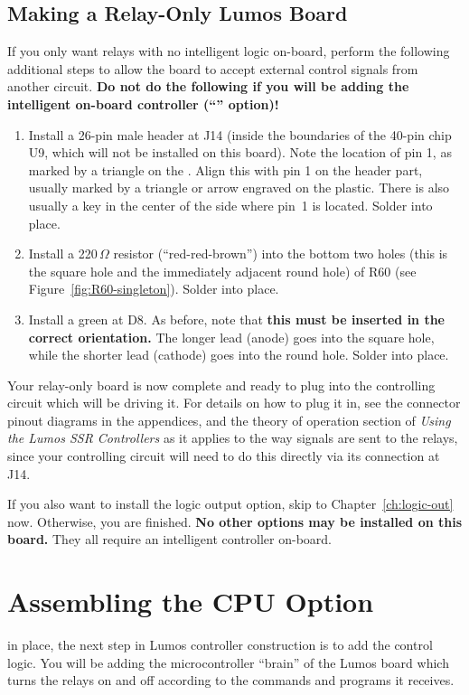 \documentclass[letterpaper,twoside,onecolumn,openright,final]{memoir}
\begin{document}
\section{Making a Relay-Only Lumos Board}
If you only want relays with no intelligent logic on-board, perform the following additional
steps to allow the board to accept external control signals from another circuit.  {\bfseries Do not
do the following if you will be adding the intelligent on-board controller (``'' option)!}
\begin{enumerate}
\item	
	Install a 26-pin male header at J14 (inside the boundaries of the 40-pin chip U9, which will
	not be installed on this board).  Note the location of pin 1, as marked by a triangle on the
	.  Align this with pin 1 on the header part, usually marked by a triangle or arrow
	engraved on the plastic.  There is also usually a key in the center of the side where pin~1
	is located.  Solder into place.
\item	
	Install a 220\,$\Omega$ resistor (``red-red-brown'') 
	into the bottom two holes (this is the square hole and the
	immediately adjacent round hole) of R60 (see Figure~\ref{fig:R60-singleton}).  Solder into place.
\item	
	Install a green  at D8.  As before, note that {\bfseries this must be inserted
	in the correct orientation.} The longer lead (anode) goes into the square hole, while the shorter
	lead (cathode) goes into the round hole.  Solder into place.
\end{enumerate}

Your relay-only board is now complete and ready to plug into the controlling circuit which will
be driving it.  For details on how to plug it in, see the connector pinout diagrams in the appendices,
and the theory of operation section of \emph{Using the Lumos SSR Controllers} as it applies to the way
signals are sent to the relays, since your controlling circuit will need to do this directly via
its connection at J14.

If you also want to install the logic output option, skip to Chapter~\ref{ch:logic-out} now.  Otherwise,
you are finished.  {\bfseries No other options may be installed on this board.} They all require
an intelligent controller on-board.

\bigskip


\chapter{Assembling the CPU Option}\label{ch:cpu}
 in place, the next step in Lumos controller construction
is to add the control logic.  You will be adding the microcontroller ``brain'' of the Lumos board
which turns the relays on and off according to the commands and programs it receives.
\end{document}
